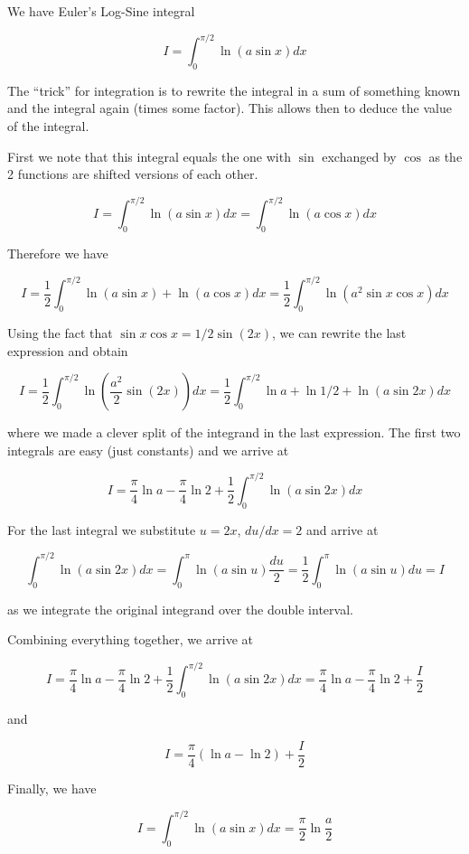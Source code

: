 
We have Euler's Log-Sine integral

\[
I = \int_0^{\pi/2} \ln(a \sin x) dx
\]

The ``trick'' for integration is to rewrite the integral in a sum of
something known and the integral again (times some factor). This allows
then to deduce the value of the integral.

First we note that this integral equals the one with \(\sin\) exchanged
by \(\cos\) as the 2 functions are shifted versions of each other.

\[
I = \int_0^{\pi/2} \ln(a \sin x) dx = \int_0^{\pi/2} \ln(a \cos x) dx
\]

Therefore we have

\[
I = \frac{1}{2} \int_0^{\pi/2} \ln(a \sin x) + \ln(a \cos x) dx = \frac{1}{2} \int_0^{\pi/2} \ln(a^2 \sin x \cos x) dx
\]

Using the fact that \(\sin x \cos x = 1/2 \sin(2x)\), we can rewrite the
last expression and obtain

\[
I = \frac{1}{2} \int_0^{\pi/2} \ln \left( \frac{a^2}{2} \sin(2x) \right) dx = \frac{1}{2} \int_0^{\pi/2} \ln a + \ln 1/2 + \ln(a \sin 2x) dx
\]

where we made a clever split of the integrand in the last expression.
The first two integrals are easy (just constants) and we arrive at

\[
I =  \frac{\pi}{4}\ln a - \frac{\pi}{4}\ln 2 + \frac{1}{2} \int_0^{\pi/2} \ln(a \sin 2x) dx
\]

For the last integral we substitute \(u=2x\), \(du/dx=2\) and arrive at

\[
\int_0^{\pi/2} \ln(a \sin 2x) dx = \int_0^{\pi} \ln(a \sin u) \frac{du}{2} = \frac{1}{2} \int_0^{\pi} \ln(a \sin u) du = I
\]

as we integrate the original integrand over the double interval.

Combining everything together, we arrive at

\[
I =  \frac{\pi}{4}\ln a - \frac{\pi}{4}\ln 2 + \frac{1}{2} \int_0^{\pi/2} \ln(a \sin 2x) dx = \frac{\pi}{4}\ln a - \frac{\pi}{4}\ln 2 + \frac{I}{2}
\]

and

\[
I = \frac{\pi}{4} \left( \ln a - \ln 2\right) + \frac{I}{2}
\]

Finally, we have

\[
I = \int_0^{\pi/2} \ln(a \sin x) dx = \frac{\pi}{2} \ln \frac{a}{2}
\]

